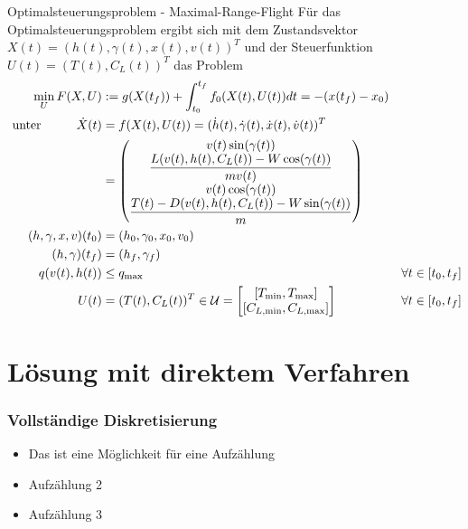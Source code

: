 \documentclass[aspectratio=169]{beamer}
\begin{document}
\begin{frame}
  \begin{block}{Optimalsteuerungsproblem - Maximal-Range-Flight}
    \tiny    
    Für das Optimalsteuerungsproblem ergibt sich mit dem Zustandsvektor
    $X(t) = (h(t),\gamma(t),x(t),v(t))^T$
    und der Steuerfunktion
    $U(t) = (T(t),C_L(t))^T$
    das Problem
    \begin{align*}
        \min_{U} F(X,U) &:= g(X(t_f)) + \int_{t_0}^{t_f} f_0(X(t),U(t)) dt = -(x(t_f) - x_0) & & \\\
        \text{unter} \hspace{10mm} \dot{X}(t) &= f(X(t),U(t)) = (\dot{h}(t),\dot{\gamma}(t),\dot{x}(t),\dot{v}(t))^T  & & \\\
        &= 
        \begin{pmatrix}
            v(t) \sin(\gamma(t)) \\ 
            \dfrac{L(v(t),h(t),C_L(t)) - W \cos(\gamma(t))}{mv(t)} \\ 
            v(t) \cos(\gamma(t)) \\ 
            \dfrac{T(t) - D(v(t),h(t),C_L(t)) - W \sin(\gamma(t))}{m}
        \end{pmatrix} & & \\\
        (h,\gamma,x,v)(t_0) &= (h_0,\gamma_0,x_0,v_0) & & \\\
        (h,\gamma)(t_f) &= (h_f,\gamma_f) & & \\\
        q(v(t),h(t)) &\leq q_{\max} & & \forall t \in [t_0,t_f]\\\
        U(t) &= (T(t),C_L(t))^T \in \mathcal{U} = \left[ 
        \begin{matrix}
            [T_{\min},T_{\max}] \\ 
            [C_{L, \min},C_{L, \max}]
        \end{matrix} 
        \right] & & \forall t \in [t_0,t_f]
    \end{align*}
  \end{block}
\end{frame}


\section{Lösung mit direktem Verfahren}
\begin{frame}
  \frametitle{Vollständige Diskretisierung}
\vspace{-2.6cm}
  \begin{itemize}
    \item Das ist eine M\"{o}glichkeit f\"{u}r eine Aufz\"{a}hlung
    \item Aufz\"{a}hlung 2
    \item Aufz\"{a}hlung 3
  \end{itemize}
\end{frame}
\end{document}
